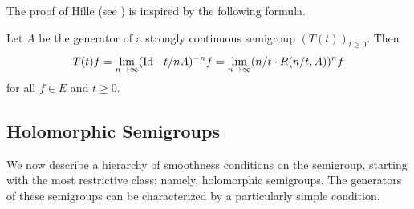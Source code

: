 The proof of Hille (see \textcite{kato:1976}) is inspired by the following formula.
\begin{proposition}\label{prop:a2-1.10}
Let $A$ be the generator of a strongly continuous semigroup $(T(t))_{t \geq 0}$.
Then
\begin{equation}\label{eq:a2-1.3}
    T(t)f = \lim_{n \to \infty} (\operatorname{Id} - t/nA)^{-n} f = \lim_{n \to \infty} (n/t \cdot R(n/t,A))^{n} f
\end{equation}
for all $f \in E$ and $t \geq 0$.
\end{proposition}
\subsection{Holomorphic Semigroups} \label{subsec:a2-1.se4}%
We now describe a hierarchy of smoothness conditions on the semigroup, starting with the most restrictive class; namely, holomorphic semigroups.
The generators of these semigroups can be characterized by a particularly simple condition.

